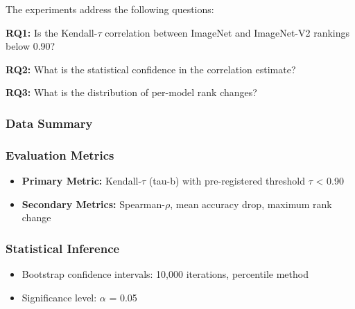 
The experiments address the following questions:

\textbf{RQ1:} Is the Kendall-$\tau$ correlation between ImageNet and ImageNet-V2 rankings below 0.90?

\textbf{RQ2:} What is the statistical confidence in the correlation estimate?

\textbf{RQ3:} What is the distribution of per-model rank changes?

\subsubsection{Data Summary}

\begin{table}[htbp]
\centering
{}
\end{table}

\subsubsection{Evaluation Metrics}

\begin{itemize}
\item \textbf{Primary Metric:} Kendall-$\tau$ (tau-b) with pre-registered threshold $\tau$ < 0.90
\item \textbf{Secondary Metrics:} Spearman-$\rho$, mean accuracy drop, maximum rank change
\end{itemize}

\subsubsection{Statistical Inference}

\begin{itemize}
\item Bootstrap confidence intervals: 10,000 iterations, percentile method
\item Significance level: $\alpha$ = 0.05
\end{itemize}

